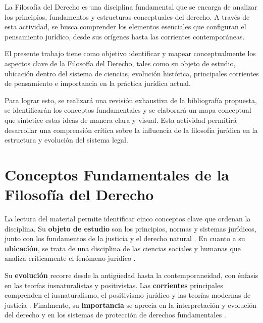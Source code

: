 \documentclass[
	spanish, %
	letterpaper, oneside
]{article}
\begin{document}
\begin{flushleft}
La Filosofía del Derecho es una disciplina fundamental que se encarga de analizar los principios, fundamentos y estructuras conceptuales del derecho. A través de esta actividad, se busca comprender los elementos esenciales que configuran el pensamiento jurídico, desde sus orígenes hasta las corrientes contemporáneas.

El presente trabajo tiene como objetivo identificar y mapear conceptualmente los aspectos clave de la Filosofía del Derecho, tales como su objeto de estudio, ubicación dentro del sistema de ciencias, evolución histórica, principales corrientes de pensamiento e importancia en la práctica jurídica actual.

Para lograr esto, se realizará una revisión exhaustiva de la bibliografía propuesta, se identificarán los conceptos fundamentales y se elaborará un mapa conceptual que sintetice estas ideas de manera clara y visual. Esta actividad permitirá desarrollar una comprensión crítica sobre la influencia de la filosofía jurídica en la estructura y evolución del sistema legal.
\end{flushleft}

\section{Conceptos Fundamentales de la Filosofía del Derecho}

La lectura del material permite identificar cinco conceptos clave que ordenan la disciplina. Su \textbf{objeto de estudio} son los principios, normas y sistemas jurídicos, junto con los fundamentos de la justicia y el derecho natural \cite{finnisEstudiosTeoriaDerecho2017,lovonManualPracticoFilosofia2020}. En cuanto a su \textbf{ubicación}, se trata de una disciplina de las ciencias sociales y humanas que analiza críticamente el fenómeno jurídico \cite{ruizrodriguezFilosofiaDerecho2009}.

Su \textbf{evolución} recorre desde la antigüedad hasta la contemporaneidad, con énfasis en las teorías iusnaturalistas y positivistas. Las \textbf{corrientes} principales comprenden el iusnaturalismo, el positivismo jurídico y las teorías modernas de justicia \cite{finnisEstudiosTeoriaDerecho2017,ruizrodriguezFilosofiaDerecho2009,lovonManualPracticoFilosofia2020}. Finalmente, su \textbf{importancia} se aprecia en la interpretación y evolución del derecho y en los sistemas de protección de derechos fundamentales \cite{cpeum2026,LeyAmparoReglamentaria}.
\end{document}
